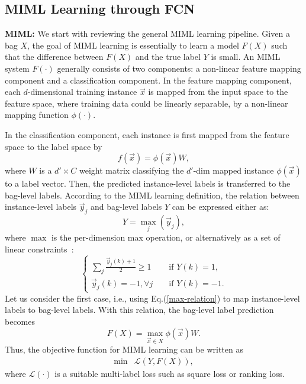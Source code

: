 \documentclass[10pt,twocolumn,letterpaper]{article}
\begin{document}
\subsection{MIML Learning through FCN}
\label{FCN}

\textbf{MIML:} We start with reviewing the general MIML learning
pipeline. Given a bag $X$, the goal of MIML learning is
essentially to learn a model $F(X)$ such that the difference
between $F(X)$ and the true label $Y$ is small. An MIML system
$F(\cdot)$ generally consists of two components: a non-linear
feature mapping component and a classification component. In the
feature mapping component, each $d$-dimensional training instance
$\vec{x}$ is mapped from the input space to the feature space,
where training data could be linearly separable, by a non-linear
mapping function $\phi(\cdot)$.

In the classification component, each instance is first mapped
from the feature space to the label space by
\begin{equation}
f(\vec{x}) =  \phi(\vec{x}) W,
\end{equation}
where $W$ is a $d'\times C$ weight matrix classifying the $d'$-dim
mapped instance $\phi(\vec{x})$ to a label vector. Then, the
predicted instance-level labels is transferred to the bag-level
labels. According to the MIML learning definition, the relation
between instance-level labels $\vec{y}_{j}$ and bag-level labels
$Y$ can be expressed either as:
\begin{equation}
\label{max-relation} Y = \max_j(\vec{y}_{j}),
\end{equation}
where $\max$ is the per-dimension max operation, or alternatively
as a set of linear constraints~\cite{Andrews2002}:
\begin{equation}
\left\{\begin{matrix}

\sum_{j} {\frac{\vec{y}_{j}(k) + 1}{2}} \geq 1 && \text{ if } Y(k) = 1,\\
\vec{y}_{j}(k) = -1, \forall j&& \text{ if } Y(k) = -1.

\end{matrix}\right.
\end{equation}
Let us consider the first case, i.e., using
Eq.(\ref{max-relation}) to map instance-level labels to bag-level
labels. With this relation, the bag-level label prediction becomes
\begin{equation} \label{eq:FX}
F(X) = \max_{\vec{x}\in X} \phi(\vec{x}) W .
\end{equation}
Thus, the objective function for MIML learning can be written as
\begin{equation}
\label{obj1}
\begin{matrix}
\min & \mathcal{L}(Y, F(X)),
\end{matrix}
\end{equation}
where $\mathcal{L}(\cdot)$ is a suitable multi-label loss such as
square loss or ranking loss.
\end{document}
